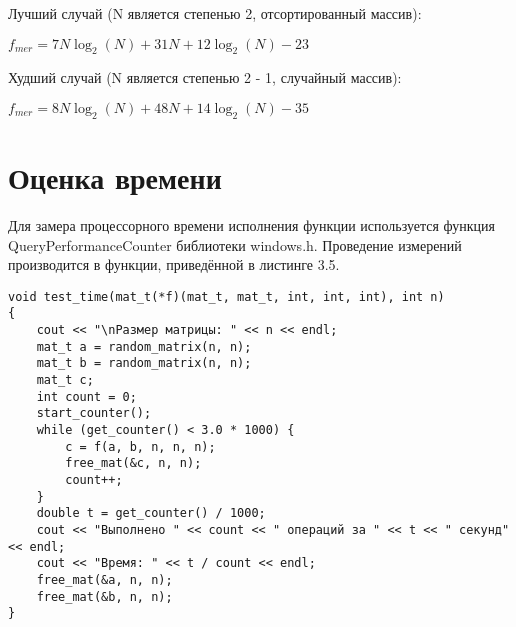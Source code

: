 	Лучший случай (N является степенью 2, отсортированный массив):
	\par $ f_{mer} = 7N\log_{2}(N) + 31N + 12\log_{2}(N) - 23 $
	
	Худший случай (N является степенью 2 - 1, случайный массив):
	\par $ f_{mer} = 8N\log_{2}(N) + 48N + 14\log_{2}(N) - 35 $

\section{Оценка времени}
Для замера процессорного времени исполнения функции используется функция QueryPerformanceCounter библиотеки windows.h\cite{QueryPerformanceCounter}. Проведение измерений производится в функции, приведённой в листинге 3.5.

\begin{lstlisting}[caption = Функция замера процессорного времени работы функции]
void test_time(mat_t(*f)(mat_t, mat_t, int, int, int), int n)
{
	cout << "\nРазмер матрицы: " << n << endl;
	mat_t a = random_matrix(n, n);
	mat_t b = random_matrix(n, n);
	mat_t c;
	int count = 0;
	start_counter();
	while (get_counter() < 3.0 * 1000) {
		c = f(a, b, n, n, n);
		free_mat(&c, n, n);
		count++;
	}
	double t = get_counter() / 1000;
	cout << "Выполнено " << count << " операций за " << t << " секунд" << endl;
	cout << "Время: " << t / count << endl;
	free_mat(&a, n, n);
	free_mat(&b, n, n);
}
\end{lstlisting}

